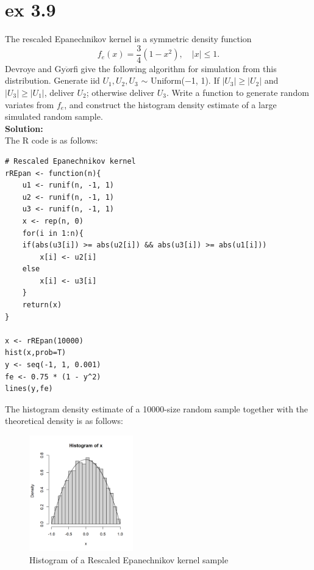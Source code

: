 \documentclass[UTF8]{ctexart}
\begin{document}
\section{ex 3.9}
The rescaled Epanechnikov kernel is a symmetric density function
\begin{equation*}
    f_e(x) = \frac{3}{4} (1 - x^2), \quad |x| \leq 1.
\end{equation*}
Devroye and Gy$\ddot{o}$rfi give the following algorithm for simulation
from this distribution. Generate iid $U_1, U_2, U_3$ $\sim$  Uniform(−1, 1). If $|U_3| \geq |U_2|$ and $|U_3| \geq |U_1|$, 
deliver $U_2$; otherwise deliver $U_3$.
Write a function to generate random variates from $f_e$, and construct the histogram density
estimate of a large simulated random sample.\\
\textbf{Solution:}\\
The R code is as follows:
\begin{lstlisting}
# Rescaled Epanechnikov kernel
rREpan <- function(n){
    u1 <- runif(n, -1, 1)
    u2 <- runif(n, -1, 1)
    u3 <- runif(n, -1, 1)
    x <- rep(n, 0)
    for(i in 1:n){
    if(abs(u3[i]) >= abs(u2[i]) && abs(u3[i]) >= abs(u1[i]))
        x[i] <- u2[i]
    else
        x[i] <- u3[i]
    }
    return(x)
}

x <- rREpan(10000)
hist(x,prob=T)
y <- seq(-1, 1, 0.001)
fe <- 0.75 * (1 - y^2)
lines(y,fe)
\end{lstlisting}
The histogram density estimate of a 10000-size random sample together with the theoretical density is as follows:
\begin{figure}[H]
    \centering
    \includegraphics[width=0.4\textwidth]{ex3-9.png}
    \caption{Histogram of a Rescaled Epanechnikov kernel sample}
\end{figure}
\end{document}

